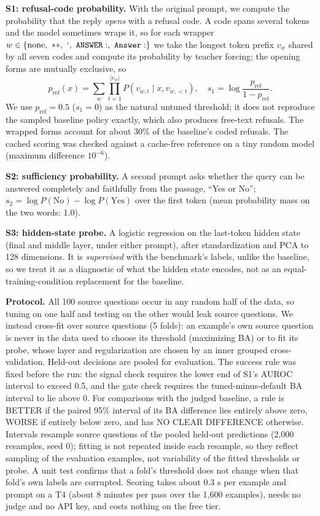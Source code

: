 \documentclass[conference]{IEEEtran}
\begin{document}
\textbf{S1: refusal-code probability.} With the original prompt, we compute the probability that the reply \emph{opens} with a refusal code. A code spans several tokens and the model sometimes wraps it, so for each wrapper $w\in\{\text{none},\ \mathtt{**},\ \mathtt{`},\ \mathtt{ANSWER:},\ \mathtt{Answer:}\}$ we take the longest token prefix $v_w$ shared by all seven codes and compute its probability by teacher forcing; the opening forms are mutually exclusive, so
\begin{equation}
p_{\text{ref}}(x)=\sum_{w}\prod_{t=1}^{|v_w|}P\!\left(v_{w,t}\mid x,v_{w,<t}\right),\quad s_1=\log\frac{p_{\text{ref}}}{1-p_{\text{ref}}}.
\end{equation}
We use $p_{\text{ref}}=0.5$ ($s_1=0$) as the natural untuned threshold; it does not reproduce the sampled baseline policy exactly, which also produces free-text refusals. The wrapped forms account for about 30\% of the baseline's coded refusals. The cached scoring was checked against a cache-free reference on a tiny random model (maximum difference $10^{-6}$).

\textbf{S2: sufficiency probability.} A second prompt asks whether the query can be answered completely and faithfully from the passage, ``Yes or No''; $s_2=\log P(\text{No})-\log P(\text{Yes})$ over the first token (mean probability mass on the two words: 1.0).

\textbf{S3: hidden-state probe.} A logistic regression on the last-token hidden state (final and middle layer, under either prompt), after standardization and PCA to 128 dimensions. It is \emph{supervised} with the benchmark's labels, unlike the baseline, so we treat it as a diagnostic of what the hidden state encodes, not as an equal-training-condition replacement for the baseline.

\textbf{Protocol.} All 100 source questions occur in any random half of the data, so tuning on one half and testing on the other would leak source questions. We instead cross-fit over source questions (5 folds): an example's own source question is never in the data used to choose its threshold (maximizing BA) or to fit its probe, whose layer and regularization are chosen by an inner grouped cross-validation. Held-out decisions are pooled for evaluation. The success rule was fixed before the run: the signal check requires the lower end of S1's AUROC interval to exceed 0.5, and the gate check requires the tuned-minus-default BA interval to lie above 0. For comparisons with the judged baseline, a rule is BETTER if the paired 95\% interval of its BA difference lies entirely above zero, WORSE if entirely below zero, and has NO CLEAR DIFFERENCE otherwise. Intervals resample source questions of the pooled held-out predictions (2{,}000 resamples, seed 0); fitting is not repeated inside each resample, so they reflect sampling of the evaluation examples, not variability of the fitted thresholds or probe. A unit test confirms that a fold's threshold does not change when that fold's own labels are corrupted. Scoring takes about 0.3 s per example and prompt on a T4 (about 8 minutes per pass over the 1{,}600 examples), needs no judge and no API key, and costs nothing on the free tier.
\end{document}
